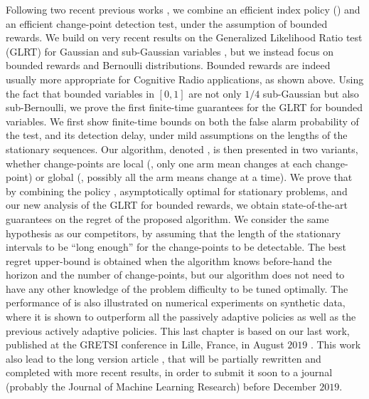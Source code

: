 Following two recent previous works \cite{LiuLeeShroff17,CaoZhenKvetonXie18}, we combine an efficient index policy (\klUCB) and an efficient change-point detection test, under the assumption of bounded rewards.
We build on very recent results on the Generalized Likelihood Ratio test (GLRT) for Gaussian and sub-Gaussian variables \cite{Maillard2018GLR}, but we instead focus on bounded rewards and Bernoulli distributions.
Bounded rewards are indeed usually more appropriate for Cognitive Radio applications, as shown above.
Using the fact that bounded variables in $[0,1]$ are not only $1/4$ sub-Gaussian but also sub-Bernoulli, we prove the first finite-time guarantees for the GLRT for bounded variables.
We first show finite-time bounds on both the false alarm probability of the test, and its detection delay, under mild assumptions on the lengths of the stationary sequences.
Our algorithm, denoted \GLRklUCB, is then presented in two variants, whether change-points are local (\ie, only one arm mean changes at each change-point) or global (\ie, possibly all the arm means change at a time).
%
We prove that by combining the policy \klUCB, asymptotically optimal for stationary problems, and our new analysis of the GLRT for bounded rewards, we obtain state-of-the-art guarantees on the regret of the proposed algorithm.
We consider the same hypothesis as our competitors, by assuming that the length of the stationary intervals to be ``long enough'' for the change-points to be detectable.
The best regret upper-bound is obtained when the algorithm knows before-hand the horizon and the number of change-points, but our algorithm does not need to have any other knowledge of the problem difficulty to be tuned optimally.
%
The performance of \GLRklUCB{} is also illustrated on numerical experiments on synthetic data, where it is shown to outperform all the passively adaptive policies as well as the previous actively adaptive policies.
%
This last chapter is based on our last work, published at the GRETSI conference in Lille, France, in August $2019$ \cite{Besson2019Gretsi}.
This work also lead to the long version article \cite{Besson2019GLRT}, that will be partially rewritten and completed with more recent results, in order to submit it soon to a journal (probably the Journal of Machine Learning Research) before December $2019$.


